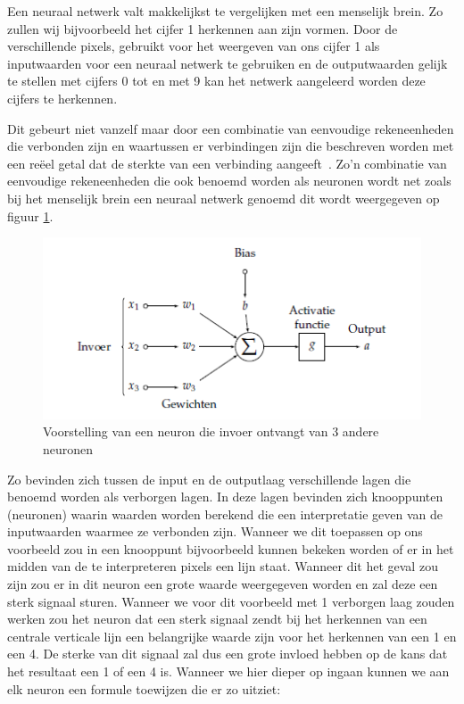 Een neuraal netwerk valt makkelijkst te vergelijken met een menselijk brein. Zo zullen wij bijvoorbeeld het cijfer 1 herkennen aan zijn vormen. Door de verschillende pixels, gebruikt voor het weergeven van ons cijfer 1 als inputwaarden voor een neuraal netwerk te gebruiken en de outputwaarden gelijk te stellen met cijfers 0 tot en met 9 kan het netwerk aangeleerd worden deze cijfers te herkennen. 

Dit gebeurt niet vanzelf maar door een combinatie van eenvoudige rekeneenheden die verbonden zijn en waartussen er verbindingen zijn die beschreven worden met een re\"{e}el getal dat de sterkte van een verbinding aangeeft~\autocite{Lievens2018a}. Zo'n combinatie van eenvoudige rekeneenheden die ook benoemd worden als neuronen wordt net zoals bij het menselijk brein een neuraal netwerk genoemd dit wordt weergegeven op figuur \ref{fig:neuron}. 

\begin{figure}
    \centering
    \caption{Voorstelling van een neuron die invoer ontvangt van 3 andere neuronen ~\autocite{Lievens2018a}}
    \label{fig:neuron}
    \includegraphics[width=0.7\linewidth]{neuron}
\end{figure}

Zo bevinden zich tussen de input en de outputlaag verschillende lagen die benoemd worden als verborgen lagen. In deze lagen bevinden zich knooppunten (neuronen) waarin waarden worden berekend die een interpretatie geven van de inputwaarden waarmee ze verbonden zijn. Wanneer we dit toepassen op ons voorbeeld zou in een knooppunt bijvoorbeeld kunnen bekeken worden of er in het midden van de te interpreteren pixels een lijn staat. Wanneer dit het geval zou zijn zou er in dit neuron een grote waarde weergegeven worden en zal deze een sterk signaal sturen. Wanneer we voor dit voorbeeld met 1 verborgen laag zouden werken zou het neuron dat een sterk signaal zendt bij het herkennen van een centrale verticale lijn een belangrijke waarde zijn voor het herkennen van een 1 en een 4. De sterke van dit signaal zal dus een grote invloed hebben op de kans dat het resultaat een 1 of een 4 is.
Wanneer we hier dieper op ingaan kunnen we aan elk neuron een formule toewijzen die er zo uitziet:


